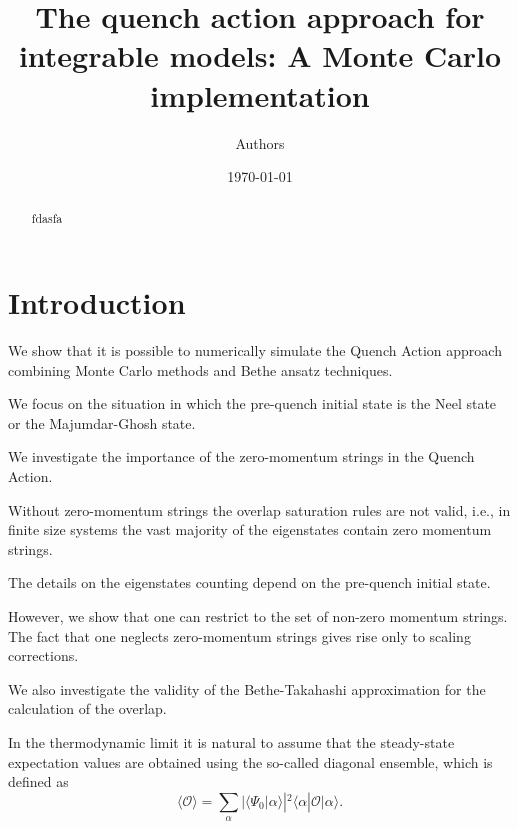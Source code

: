 \documentclass[11pt]{iopart}
\begin{document}
\setlength{\parindent}{0pt}


\title{The quench action approach for integrable models: A Monte Carlo implementation}

\author{Authors}


\date{\today}



\begin{abstract} 


fdasfa
\end{abstract}

\maketitle

\section{Introduction}
\label{intro}

We show that it is possible to numerically simulate the Quench Action approach 
combining Monte Carlo methods and Bethe ansatz techniques. 

We focus on the situation in which the pre-quench initial state is the Neel 
state or the Majumdar-Ghosh state. 

We investigate the importance of the zero-momentum strings in the Quench Action. 

Without zero-momentum strings the overlap saturation rules are not valid, 
i.e., in finite size systems the vast majority of the eigenstates contain 
zero momentum strings. 

The details on the eigenstates counting depend on the pre-quench initial state. 

However, we show that one can restrict to the set of non-zero momentum strings. 
The fact that one neglects zero-momentum strings gives rise only to scaling 
corrections. 

We also investigate the validity of the Bethe-Takahashi approximation for the 
calculation of the overlap. 

In the thermodynamic limit it is natural to assume that the steady-state expectation 
values are obtained using the so-called diagonal ensemble, which is defined as 
%
\begin{equation}
\label{d-ensemble}
\langle{\mathcal O}\rangle=\sum\limits_{\alpha}|\langle\Psi_0|\alpha\rangle|^2
\langle\alpha|{\mathcal O}|\alpha\rangle. 
\end{equation}
%
\end{document}
